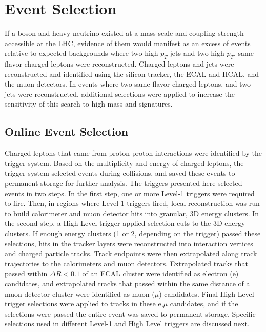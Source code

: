 \chapter{Event Selection}
\label{sec:event_selection_chapter}

If a \WR boson and heavy neutrino \nul existed at a mass scale and coupling strength accessible 
at the LHC, evidence of them would manifest as an excess of events relative to expected backgrounds 
where two high-$p_{T}$ jets and two high-$p_{T}$, same flavor charged leptons were reconstructed.  
Charged leptons and jets were reconstructed and identified using the silicon tracker, the ECAL and 
HCAL, and the muon detectors.  In events where two same flavor charged leptons, and two jets were 
reconstructed, additional selections were applied to increase the sensitivity of this search to 
high-mass \WR and \nul signatures.

\section{Online Event Selection}
\label{sec:triggers}
Charged leptons that came from proton-proton interactions were identified by the trigger system.  Based 
on the multiplicity and energy of charged leptons, the trigger system selected events during 
collisions, and saved these events to permanent storage for further analysis.  The triggers presented 
here selected events in two steps.  In the first step, one or more Level-1 triggers were 
required to fire.  Then, in regions where Level-1 triggers fired, local reconstruction was run to 
build calorimeter and muon detector hits into granular, 3D energy clusters.  In the second step, 
a High Level trigger applied selection cuts to the 3D energy clusters.  If 
enough energy clusters (1 or 2, depending on the trigger) passed these selections, hits in the tracker 
layers were reconstructed into interaction vertices and charged particle tracks.  Track endpoints 
were then extrapolated along track trajectories to the calorimeters and muon detectors.  Extrapolated 
tracks that passed within $\Delta R < 0.1$ of an ECAL cluster were identified as electron (e) 
candidates, and extrapolated tracks that passed within the same distance of a muon detector cluster 
were identified as muon ($\mu$) candidates.  Final High Level trigger selections were applied to 
tracks in these e,$\mu$ candidates, and if the selections were passed the entire event was saved 
to permanent storage.  Specific selections used in different Level-1 and High Level triggers are 
discussed next.


